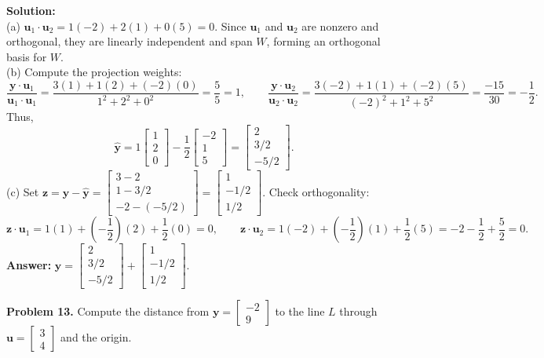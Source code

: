 \documentclass[11pt, letterpaper]{article}
\theoremstyle{definition}
\theoremstyle{remark}
\begin{document}
\textbf{Solution:} \\
(a) $\mathbf{u}_1 \cdot \mathbf{u}_2 = 1(-2) + 2(1) + 0(5) = 0$. Since $\mathbf{u}_1$ and $\mathbf{u}_2$ are nonzero and orthogonal, they are linearly independent and span $W$, forming an orthogonal basis for $W$. \\
(b) Compute the projection weights:
\[
\frac{\mathbf{y} \cdot \mathbf{u}_1}{\mathbf{u}_1 \cdot \mathbf{u}_1} = \frac{3(1) + 1(2) + (-2)(0)}{1^2 + 2^2 + 0^2} = \frac{5}{5} = 1, \qquad
\frac{\mathbf{y} \cdot \mathbf{u}_2}{\mathbf{u}_2 \cdot \mathbf{u}_2} = \frac{3(-2) + 1(1) + (-2)(5)}{(-2)^2 + 1^2 + 5^2} = \frac{-15}{30} = -\frac{1}{2}.
\]
Thus,
\[
\hat{\mathbf{y}} = 1\begin{bmatrix} 1 \\ 2 \\ 0 \end{bmatrix} - \frac{1}{2}\begin{bmatrix} -2 \\ 1 \\ 5 \end{bmatrix} = \begin{bmatrix} 2 \\ 3/2 \\ -5/2 \end{bmatrix}.
\]
(c) Set $\mathbf{z} = \mathbf{y} - \hat{\mathbf{y}} = \begin{bmatrix} 3 - 2 \\ 1 - 3/2 \\ -2 - (-5/2) \end{bmatrix} = \begin{bmatrix} 1 \\ -1/2 \\ 1/2 \end{bmatrix}$. Check orthogonality:
\[
\mathbf{z} \cdot \mathbf{u}_1 = 1(1) + \left(-\frac{1}{2}\right)(2) + \frac{1}{2}(0) = 0, \qquad
\mathbf{z} \cdot \mathbf{u}_2 = 1(-2) + \left(-\frac{1}{2}\right)(1) + \frac{1}{2}(5) = -2 - \frac{1}{2} + \frac{5}{2} = 0.
\]
\textbf{Answer:} $\mathbf{y} = \begin{bmatrix} 2 \\ 3/2 \\ -5/2 \end{bmatrix} + \begin{bmatrix} 1 \\ -1/2 \\ 1/2 \end{bmatrix}$.

\textbf{Problem 13.} Compute the distance from $\mathbf{y} = \begin{bmatrix} -2 \\ 9 \end{bmatrix}$ to the line $L$ through $\mathbf{u} = \begin{bmatrix} 3 \\ 4 \end{bmatrix}$ and the origin.
\end{document}
